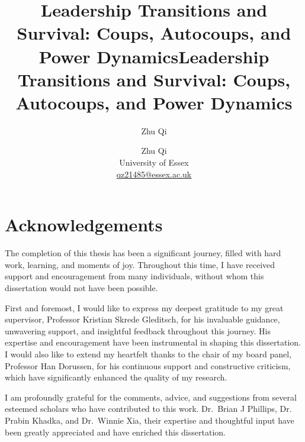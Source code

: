\documentclass[
  12pt,
]{report}
\title{Leadership Transitions and Survival: Coups, Autocoups, and Power
Dynamics}
\author{Zhu Qi}
\date{}
\renewcommand*\contentsname{Table of contents}
\newcommand\contentsname{Table of contents}
\begin{document}
\def\spacingset#1{\renewcommand{\baselinestretch}%
{#1}\small\normalsize} \spacingset{1}



\title{\bf Leadership Transitions and Survival: Coups, Autocoups, and
Power Dynamics}
\author{
Zhu Qi\\University of
Essex\\\href{mailto:qz21485@essex.ac.uk}{qz21485@essex.ac.uk}
}

\maketitle

\bigskip
\bigskip
\begin{abstract}

\end{abstract}


\newpage
\spacingset{1.9} %
\renewcommand*\contentsname{Contents}
{
\hypersetup{linkcolor=}
\setcounter{tocdepth}{2}
\tableofcontents
}
\listoffigures
\listoftables
{}
\chapter*{Acknowledgements}\label{acknowledgements}

The completion of this thesis has been a significant journey, filled
with hard work, learning, and moments of joy. Throughout this time, I
have received support and encouragement from many individuals, without
whom this dissertation would not have been possible.

First and foremost, I would like to express my deepest gratitude to my
great supervisor, Professor Kristian Skrede Gleditsch, for his
invaluable guidance, unwavering support, and insightful feedback
throughout this journey. His expertise and encouragement have been
instrumental in shaping this dissertation. I would also like to extend
my heartfelt thanks to the chair of my board panel, Professor Han
Dorussen, for his continuous support and constructive criticism, which
have significantly enhanced the quality of my research.

I am profoundly grateful for the comments, advice, and suggestions from
several esteemed scholars who have contributed to this work. Dr.~Brian J
Phillips, Dr. Prabin Khadka, and Dr.~Winnie Xia, their expertise and
thoughtful input have been greatly appreciated and have enriched this
dissertation.
\end{document}
